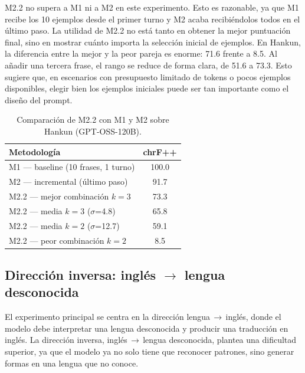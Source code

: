 M2.2 no supera a M1 ni a M2 en este experimento. Esto es razonable, ya que M1 recibe los 10 ejemplos desde el primer turno y M2 acaba recibiéndolos todos en el último paso. La utilidad de M2.2 no está tanto en obtener la mejor puntuación final, sino en mostrar cuánto importa la selección inicial de ejemplos. En Hankun, la diferencia entre la mejor y la peor pareja es enorme: 71.6 frente a 8.5. Al añadir una tercera frase, el rango se reduce de forma clara, de 51.6 a 73.3. Esto sugiere que, en escenarios con presupuesto limitado de tokens o pocos ejemplos disponibles, elegir bien los ejemplos iniciales puede ser tan importante como el diseño del prompt.

\begin{table}[h]
	\centering
	\caption{Comparación de M2.2 con M1 y M2 sobre Hankun (GPT-OSS-120B).}
	\label{tab:m22_comparacion}
	\begin{tabular}{lc}
		\toprule
		\textbf{Metodología} & \textbf{chrF++} \\
		\midrule
		M1 — baseline (10 frases, 1 turno)      & 100.0 \\
		M2 — incremental (último paso)           & 91.7 \\
		M2.2 — mejor combinación $k=3$           & 73.3 \\
		M2.2 — media $k=3$ ($\sigma$=4.8)        & 65.8 \\
		M2.2 — media $k=2$ ($\sigma$=12.7)       & 59.1 \\
		M2.2 — peor combinación $k=2$            &  8.5 \\
		\bottomrule
	\end{tabular}
\end{table}

\subsection{Dirección inversa: inglés \texorpdfstring{$\rightarrow$}{→} lengua desconocida}
\label{subsec:en2lang}

El experimento principal se centra en la dirección lengua\,$\rightarrow$\,inglés, donde el modelo debe interpretar una lengua desconocida y producir una traducción en inglés. La dirección inversa, inglés\,$\rightarrow$\,lengua desconocida, plantea una dificultad superior, ya que el modelo ya no solo tiene que reconocer patrones, sino generar formas en una lengua que no conoce.

